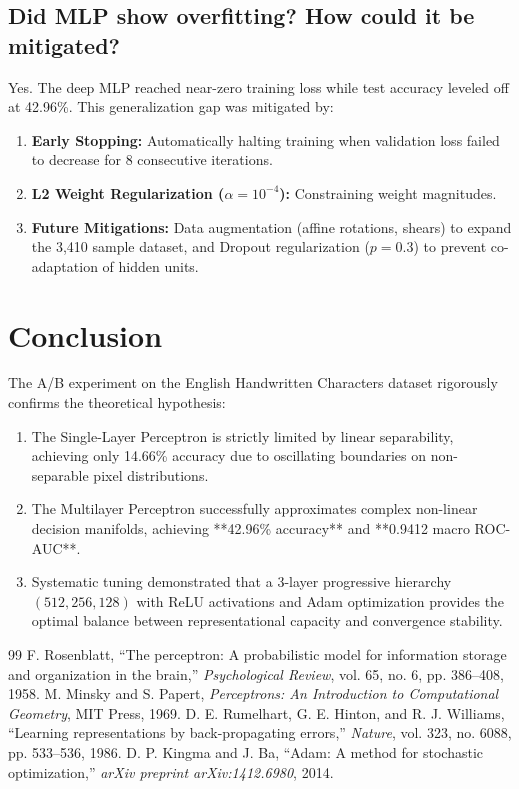 \documentclass[12pt,a4paper]{article}
\begin{document}
\subsection{Did MLP show overfitting? How could it be mitigated?}
Yes. The deep MLP reached near-zero training loss while test accuracy leveled off at 42.96\%. This generalization gap was mitigated by:
\begin{enumerate}
\item \textbf{Early Stopping:} Automatically halting training when validation loss failed to decrease for 8 consecutive iterations.
\item \textbf{L2 Weight Regularization ($\alpha = 10^{-4}$):} Constraining weight magnitudes.
\item \textbf{Future Mitigations:} Data augmentation (affine rotations, shears) to expand the 3,410 sample dataset, and Dropout regularization ($p=0.3$) to prevent co-adaptation of hidden units.
\end{enumerate}

\section{Conclusion}
The A/B experiment on the English Handwritten Characters dataset rigorously confirms the theoretical hypothesis:
\begin{enumerate}
\item The Single-Layer Perceptron is strictly limited by linear separability, achieving only 14.66\% accuracy due to oscillating boundaries on non-separable pixel distributions.
\item The Multilayer Perceptron successfully approximates complex non-linear decision manifolds, achieving **42.96\% accuracy** and **0.9412 macro ROC-AUC**.
\item Systematic tuning demonstrated that a 3-layer progressive hierarchy $(512, 256, 128)$ with ReLU activations and Adam optimization provides the optimal balance between representational capacity and convergence stability.
\end{enumerate}

\begin{thebibliography}{99}
 F. Rosenblatt, ``The perceptron: A probabilistic model for information storage and organization in the brain,'' \emph{Psychological Review}, vol. 65, no. 6, pp. 386--408, 1958.
 M. Minsky and S. Papert, \emph{Perceptrons: An Introduction to Computational Geometry}, MIT Press, 1969.
 D. E. Rumelhart, G. E. Hinton, and R. J. Williams, ``Learning representations by back-propagating errors,'' \emph{Nature}, vol. 323, no. 6088, pp. 533--536, 1986.
 D. P. Kingma and J. Ba, ``Adam: A method for stochastic optimization,'' \emph{arXiv preprint arXiv:1412.6980}, 2014.
\end{thebibliography}
\end{document}
